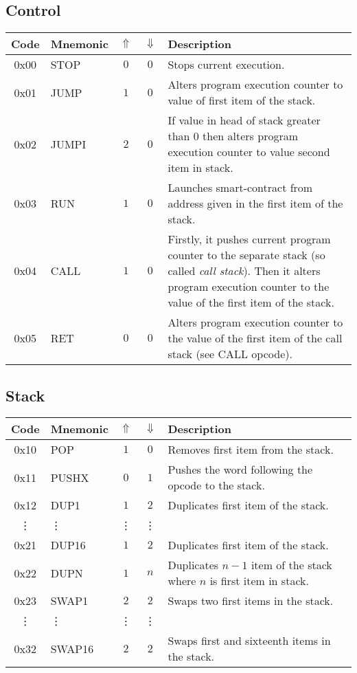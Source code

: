 \documentclass[12pt,a4paper]{article}
\begin{document}
\subsection{Control}
\begin{tabularx}{\textwidth}{ c l c c p{7cm} }
\textbf{Code} & \textbf{Mnemonic} & \textbf{$\Uparrow$} & \textbf{$\Downarrow$} & \textbf{Description} \\
\hline
0x00 & STOP & $0$ & $0$ & Stops current execution. \\
\hline
0x01 & JUMP & $1$ & $0$ & Alters program execution counter to value of first item of the stack. \\
\hline
0x02 & JUMPI & $2$ & $0$ & If value in head of stack greater than 0 then alters program execution counter to value second item in stack.  \\
\hline
0x03 & RUN & $1$ & $0$ & Launches smart-contract from address given in the first item of the stack.  \\
\hline
0x04 & CALL & $1$ & $0$ & Firstly, it pushes current program counter to the separate stack (so called \emph{call stack}). Then it alters program execution counter to the value of the first item of the stack.  \\
\hline
0x05 & RET & $0$ & $0$ & Alters program execution counter to the value of the first item of the call stack (see CALL opcode).  \\

\end{tabularx}

\subsection{Stack}
\begin{tabularx}{\textwidth}{ c l c c p{7cm} }
\textbf{Code} & \textbf{Mnemonic} & \textbf{$\Uparrow$} & \textbf{$\Downarrow$} & \textbf{Description} \\
\hline
0x10 & POP & $1$ & $0$ & Removes first item from the stack. \\
\hline
0x11 & PUSHX & $0$ & $1$ & Pushes the word following the opcode to the stack. \\
\hline
0x12 & DUP1 & $1$ & $2$ & Duplicates first item of the stack. \\
\vdots & \vdots & \vdots & \vdots \\
0x21 & DUP16 & $1$ & $2$ & Duplicates first item of the stack. \\
\hline
0x22 & DUPN & $1$ & $n$ & Duplicates $n-1$ item of the stack where $n$ is first item in stack. \\
\hline
0x23 & SWAP1 & $2$ & $2$ & Swaps two first items in the stack. \\
\vdots & \vdots & \vdots & \vdots \\
0x32 & SWAP16 & $2$ & $2$ & Swaps first and sixteenth items in the stack. \\
\hline
\end{tabularx}
\end{document}
